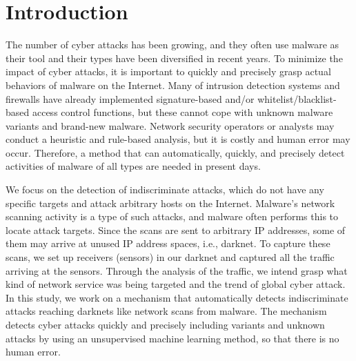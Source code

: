 \documentclass[conference]{IEEEtran}
\begin{document}
\section{Introduction}
The number of cyber attacks has been growing, and they often use malware as their tool and their types have been diversified in recent years.
To minimize the impact of cyber attacks, it is important to quickly and precisely grasp actual behaviors of malware on the Internet.
Many of intrusion detection systems and firewalls have already implemented signature-based and/or whitelist/blacklist-based access control functions, but these cannot cope with unknown malware variants and brand-new malware.
Network security operators or analysts may conduct a heuristic and rule-based analysis, but it is costly and human error may occur.
Therefore, a method that can automatically, quickly, and precisely detect activities of malware of all types are needed in present days.

We focus on the detection of indiscriminate attacks, which do not have any specific targets and attack arbitrary hosts on the Internet.
Malware's network scanning activity is a type of such attacks, and malware often performs this to locate attack targets.
Since the scans are sent to arbitrary IP addresses, some of them may arrive at unused IP address spaces, i.e., darknet.
To capture these scans, we set up receivers (sensors) in our darknet and captured all the traffic arriving at the sensors.
Through the analysis of the traffic, we intend grasp what kind of network service was being targeted and the trend of global cyber attack.
In this study, we work on a mechanism that automatically detects indiscriminate attacks reaching darknets like network scans from malware.
The mechanism detects cyber attacks quickly and precisely including variants and unknown attacks by using an unsupervised machine learning method, so that there is no human error.
\end{document}
